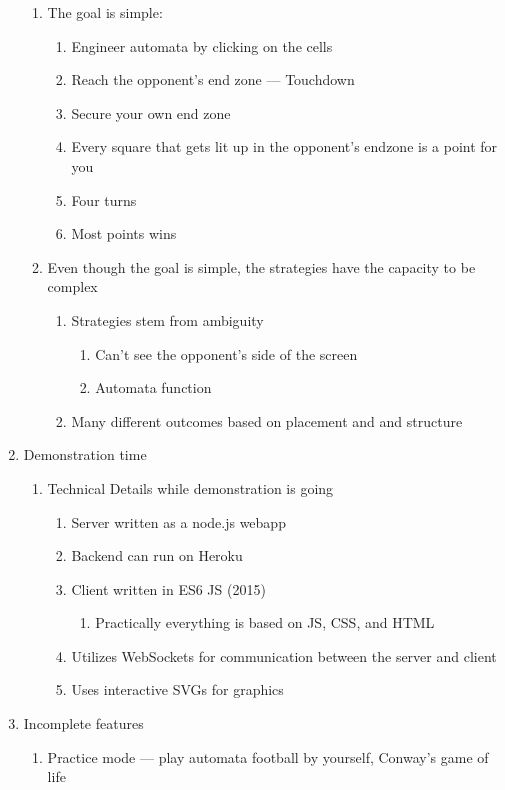 \documentclass[11pt]{article}
\begin{document}
\begin{enumerate}
\begin{enumerate}
\item The goal is simple:
\begin{enumerate}
\item Engineer automata by clicking on the cells
\item Reach the opponent's end zone --- Touchdown
\item Secure your own end zone
\item Every square that gets lit up in the opponent's endzone is a point for you
\item Four turns
\item Most points wins
\end{enumerate}
\item Even though the goal is simple, the strategies have the capacity to be complex
\begin{enumerate}
\item Strategies stem from ambiguity
\begin{enumerate}
\item Can't see the opponent's side of the screen
\item Automata function
\end{enumerate}
\item Many different outcomes based on placement and and structure
\end{enumerate}
\end{enumerate}
\item Demonstration time
\begin{enumerate}
\item Technical Details while demonstration is going
\begin{enumerate}
\item Server written as a node.js webapp
\item Backend can run on Heroku
\item Client written in ES6 JS (2015)
\begin{enumerate}
\item Practically everything is based on JS, CSS, and HTML
\end{enumerate}
\item Utilizes WebSockets for communication between the server and client
\item Uses interactive SVGs for graphics
\end{enumerate}
\end{enumerate}
\item Incomplete features
\begin{enumerate}
\item Practice mode --- play automata football by yourself, Conway's game of life

\end{enumerate}
\end{enumerate}
\end{document}
